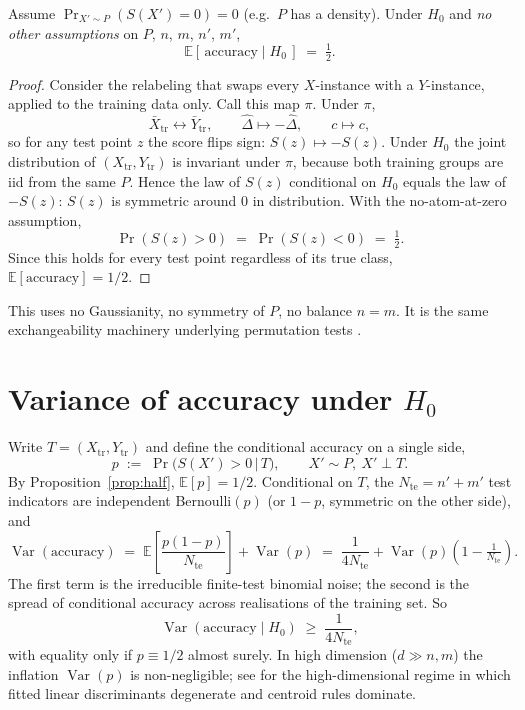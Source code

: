 \documentclass[11pt]{article}
\newcommand{\E}{\mathbb{E}}
\newcommand{\Var}{\operatorname{Var}}
\newcommand{\1}{\mathbf{1}}
\begin{document}
\begin{proposition}\label{prop:half}
Assume $\Pr_{X' \sim P}(S(X') = 0) = 0$ (e.g.\ $P$ has a density). Under
$H_0$ and \emph{no other assumptions} on $P$, $n$, $m$, $n'$, $m'$,
\[
  \E[\,\mathrm{accuracy} \mid H_0\,] \;=\; \tfrac{1}{2}.
\]
\end{proposition}

\begin{proof}
Consider the relabeling that swaps every $X$-instance with a $Y$-instance,
applied to the training data only. Call this map $\pi$. Under $\pi$,
\[
  \bar X_{\mathrm{tr}} \longleftrightarrow \bar Y_{\mathrm{tr}},
  \qquad
  \hat\Delta \longmapsto -\hat\Delta,
  \qquad
  c \longmapsto c,
\]
so for any test point $z$ the score flips sign: $S(z) \mapsto -S(z)$.
Under $H_0$ the joint distribution of $(X_{\mathrm{tr}}, Y_{\mathrm{tr}})$
is invariant under $\pi$, because both training groups are iid from the
same $P$. Hence the law of $S(z)$ conditional on $H_0$ equals the law of
$-S(z)$: $S(z)$ is symmetric around $0$ in distribution. With the
no-atom-at-zero assumption,
\[
  \Pr(S(z) > 0) \;=\; \Pr(S(z) < 0) \;=\; \tfrac{1}{2}.
\]
Since this holds for every test point regardless of its true class,
$\E[\mathrm{accuracy}] = 1/2$.
\end{proof}

This uses no Gaussianity, no symmetry of $P$, no balance $n = m$. It is
the same exchangeability machinery underlying permutation tests
\cite{LehmannRomano2005}.

\section{Variance of accuracy under \texorpdfstring{$H_0$}{H0}}\label{sec:acc-var}

Write $T = (X_{\mathrm{tr}}, Y_{\mathrm{tr}})$ and define the
conditional accuracy on a single side,
\[
  p \;:=\; \Pr\!\bigl(S(X') > 0 \,\big|\, T\bigr),
  \qquad X' \sim P, \ X' \perp T.
\]
By Proposition~\ref{prop:half}, $\E[p] = 1/2$. Conditional on $T$, the
$N_{\mathrm{te}} = n' + m'$ test indicators are independent
Bernoulli$(p)$ (or $1-p$, symmetric on the other side), and
\[
  \Var(\mathrm{accuracy})
  \;=\; \E\!\left[\frac{p(1-p)}{N_{\mathrm{te}}}\right]
       + \Var(p)
  \;=\; \frac{1}{4 N_{\mathrm{te}}}
       + \Var(p)\!\left(1 - \tfrac{1}{N_{\mathrm{te}}}\right).
\]
The first term is the irreducible finite-test binomial noise; the second
is the spread of conditional accuracy across realisations of the
training set. So
\[
  \Var(\mathrm{accuracy} \mid H_0) \;\ge\; \frac{1}{4 N_{\mathrm{te}}},
\]
with equality only if $p \equiv 1/2$ almost surely. In high dimension
($d \gg n,m$) the inflation $\Var(p)$ is non-negligible; see
\cite{BickelLevina2004} for the high-dimensional regime in which fitted
linear discriminants degenerate and centroid rules dominate.
\end{document}
